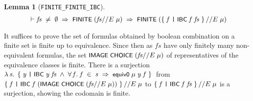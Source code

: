 \documentclass[letterpaper]{article}
\newtheorem{lm}{Lemma}
\renewcommand{\HOLConst}[1]{{\textsf{\upshape\small #1}}}
\renewcommand{\HOLinline}[1]{\ensuremath{#1}}
\newenvironment{holmath}{\begin{displaymath}\begin{array}{l}}{\end{array}\end{displaymath}\ignorespacesafterend}
\begin{document}
\begin{lm}[\texttt{FINITE_FINITE_IBC}]
\begin{holmath}
  \ensuremath{\HOLTokenTurnstile}\HOLFreeVar{fs}\;\HOLSymConst{\HOLTokenNotEqual{}}\;\HOLSymConst{\HOLTokenEmpty{}}\;\HOLSymConst{\HOLTokenImp{}}\;\HOLConst{FINITE}\;(\HOLFreeVar{fs}\HOLSymConst{//E}\;\HOLFreeVar{\ensuremath{\mu}})\;\HOLSymConst{\HOLTokenImp{}}\;\HOLConst{FINITE}\;(\HOLTokenLeftbrace{}\HOLBoundVar{f}\;\HOLTokenBar{}\;\HOLConst{IBC}\;\HOLBoundVar{f}\;\HOLFreeVar{fs}\HOLTokenRightbrace{}\HOLSymConst{//E}\;\HOLFreeVar{\ensuremath{\mu}})
\end{holmath}
\end{lm}

It suffices to prove the set of formulas obtained by boolean combination on a finite set is finite up to equivalence. Since then as $fs$ have only finitely many non-equivalent formulas, the set \HOLinline{\HOLConst{IMAGE}\;\HOLConst{CHOICE}\;(\HOLFreeVar{fs}\HOLSymConst{//E}\;\HOLFreeVar{\ensuremath{\mu}})} of representatives of the equivalence classes is finite. There is a surjection \HOLinline{\HOLTokenLambda{}\HOLBoundVar{s}.\;\HOLTokenLeftbrace{}\HOLBoundVar{y}\;\HOLTokenBar{}\;\HOLConst{IBC}\;\HOLBoundVar{y}\;\HOLFreeVar{fs}\;\HOLSymConst{\HOLTokenConj{}}\;\HOLSymConst{\HOLTokenForall{}}\HOLBoundVar{f}.\;\HOLBoundVar{f}\;\HOLSymConst{\HOLTokenIn{}}\;\HOLBoundVar{s}\;\HOLSymConst{\HOLTokenImp{}}\;\HOLConst{equiv0}\;\HOLFreeVar{\ensuremath{\mu}}\;\HOLBoundVar{y}\;\HOLBoundVar{f}\HOLTokenRightbrace{}} from 
\HOLinline{\HOLTokenLeftbrace{}\HOLBoundVar{f}\;\HOLTokenBar{}\;\HOLConst{IBC}\;\HOLBoundVar{f}\;(\HOLConst{IMAGE}\;\HOLConst{CHOICE}\;(\HOLFreeVar{fs}\HOLSymConst{//E}\;\HOLFreeVar{\ensuremath{\mu}}))\HOLTokenRightbrace{}\HOLSymConst{//E}\;\HOLFreeVar{\ensuremath{\mu}}} to \HOLinline{\HOLTokenLeftbrace{}\HOLBoundVar{f}\;\HOLTokenBar{}\;\HOLConst{IBC}\;\HOLBoundVar{f}\;\HOLFreeVar{fs}\HOLTokenRightbrace{}\HOLSymConst{//E}\;\HOLFreeVar{\ensuremath{\mu}}} is a surjection, showing the codomain is finite. 
\end{document}
